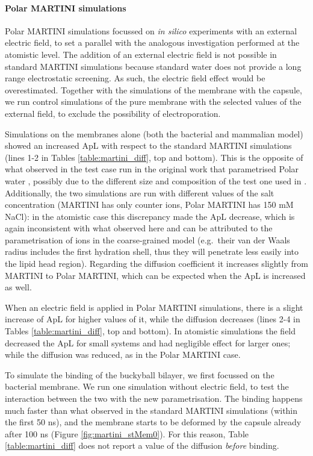 \paragraph{Polar MARTINI simulations} 
Polar MARTINI simulations focussed on \emph{in silico} experiments with an external electric field, to set a parallel with the analogous investigation performed at the atomistic level. The addition of an external electric field is not possible in standard MARTINI simulations because standard water does not provide a long range electrostatic screening. As such, the electric field effect would be overestimated.
%
Together with the simulations of the membrane with the capsule, we run control simulations of the pure membrane with the selected values of the external field, to exclude the possibility of electroporation.

Simulations on the membranes alone (both the bacterial and mammalian model) showed an increased ApL with respect to the standard MARTINI simulations (lines 1-2 in Tables \ref{table:martini_diff}, top and bottom). This is the opposite of what observed in the test case run in the original work that parametrised Polar water \citep{Yesylevskyy2010}, possibly due to the different size and composition of the test one used in \citet{Yesylevskyy2010}.
%
Additionally, the two simulations are run with different values of the salt concentration (MARTINI has only counter ions, Polar MARTINI has 150 mM NaCl): in the atomistic case this discrepancy made the ApL decrease, which is again inconsistent with what observed here and can be attributed to the parametrisation of ions in the coarse-grained model (e.g.\ their van der Waals radius includes the first hydration shell, thus they will penetrate less easily into the lipid head region).
%
Regarding the diffusion coefficient it increases slightly from MARTINI to Polar MARTINI, which can be expected when the ApL is increased as well. 

When an electric field is applied in Polar MARTINI simulations, there is a slight increase of ApL for higher values of it, while the diffusion decreases (lines 2-4 in Tables \ref{table:martini_diff}, top and bottom). In atomistic simulations the field decreased the ApL for small systems and had negligible effect for larger ones; while the diffusion was reduced, as in the Polar MARTINI case.

To simulate the binding of the buckyball bilayer, we first focussed on the bacterial membrane. We run one simulation without electric field, to test the interaction between the two with the new parametrisation. The binding happens much faster than what observed in the standard MARTINI simulations (within the first 50 ns), and the membrane starts to be deformed by the capsule already after 100 ns (Figure \ref{fig:martini_stMem0}). For this reason, Table \ref{table:martini_diff} does not report a value of the diffusion \emph{before} binding.

